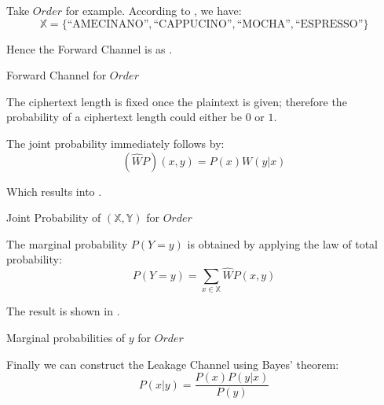 \begin{example} \label{Ex: Single_Order}
Take $Order$ for example. According to , we have:
\begin{equation*}
\mathbb{X} = \{\text{“AMECINANO”}, \text{“CAPPUCINO”}, \text{“MOCHA”}, \text{“ESPRESSO”}\}
\end{equation*}

Hence the Forward Channel is as . 
\begin{table}[H]
\begin{center}
{}
\end{center}
\caption{Forward Channel for $Order$}
\label{Tbl: Forward Channel for Order}
\end{table}

The ciphertext length is fixed once the plaintext is given; therefore the probability of a ciphertext length could either be $0$ or $1$.

The joint probability immediately follows by:
\begin{equation}
(\widehat{W}P)(x,y) = P(x)W(y|x)
\end{equation}

Which results into .

\begin{table}[H]
\begin{center}
{}
\end{center}
\caption{Joint Probability of $(\mathbb{X},\mathbb{Y})$ for $Order$}
\label{Tbl: Joint Probability of (X Y) for Order}
\end{table}

The marginal probability $P(Y=y)$ is obtained by applying the law of total probability:
\begin{equation}
P(Y=y) = \sum\limits_{x \in \mathbb{X}}{\widehat{W}P(x,y)}
\end{equation}

The result is shown in .

\begin{table}[H]
\begin{center}
{}
\end{center}
\caption{Marginal probabilities of $y$ for $Order$}
\label{Tbl: Marginal Probabilities of y for Order}
\end{table}

Finally we can construct the Leakage Channel using Bayes’ theorem:
\begin{equation}
P(x|y) = {\frac {P(x)P(y|x)} {P(y)}} 
\end{equation}


\end{example}
